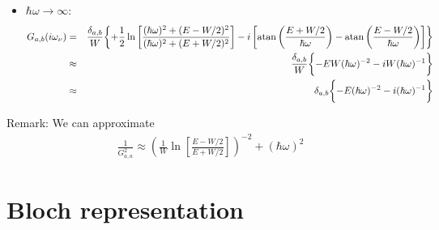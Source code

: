 \documentclass[11pt,a4paper]{report}
\begin{document}
\begin{itemize}
%
\item $\hbar\omega\rightarrow \infty$:
\begin{eqnarray}
G_{a,b}(i\omega_\nu)&=&
\frac{\delta_{a,b}}{W}
\biggl\lbrace
+\frac{1}{2}\ln\left[
\frac{(\hbar\omega)^2+(E-W/2)^2}{(\hbar\omega)^2+(E+W/2)^2}
\right]
-i \left[\atan\left(\frac{E+W/2}{\hbar\omega}\right)
-\atan\left(\frac{E-W/2}{\hbar\omega}\right)\right]
\biggr\rbrace
\nonumber\\
%
&\approx&
\frac{\delta_{a,b}}{W}
\biggl\lbrace
-EW(\hbar\omega)^{-2}
-i W (\hbar\omega)^{-1}
\biggr\rbrace
%
\nonumber\\
&\approx&
\delta_{a,b}
\biggl\lbrace
-E(\hbar\omega)^{-2}
-i  (\hbar\omega)^{-1}
\biggr\rbrace
\end{eqnarray}
\end{itemize}


Remark: We can approximate
\begin{eqnarray}
\frac{1}{G_{a,a}^2}\approx \left(
\frac{1}{W}\ln\left[\frac{E-W/2}{E+W/2}\right] \right)^{-2}
  +(\hbar\omega)^2
\end{eqnarray}






\section{Bloch representation}



\clearpage
 
 
\end{document}
